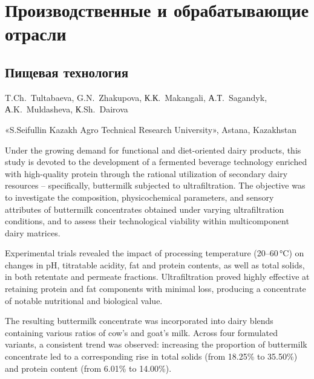 \let\cleardoublepage\clearpage
\part{Производственные и обрабатывающие отрасли}
\chapter{Пищевая технология}

\begin{header}

T.Ch.~Tultabaeva,
G.N.~Zhakupova,
К.К.~Makangali,
А.Т.~Sagandyk,
А.K.~Muldasheva,
К.Sh.~Dairova\envelope
\end{header}

\begin{affil}
«S.Seifullin Kazakh Agro Technical Research University», Astana, Kazakhstan

\end{affil}

Under the growing demand for functional and diet-oriented dairy
products, this study is devoted to the development of a fermented
beverage technology enriched with high-quality protein through the
rational utilization of secondary dairy resources -- specifically,
buttermilk subjected to ultra\-filtration. The objective was to
investigate the composition, physicochemical parameters, and sensory
attributes of buttermilk concentrates obtained under varying
ultrafiltration conditions, and to assess their technological viability
within multicomponent dairy matrices.

Experimental trials revealed the impact of processing temperature
(20--60\,°C) on changes in pH, titra\-table acidity, fat and protein
contents, as well as total solids, in both retentate and permeate
fractions. Ultra\-filtration proved highly effective at retaining protein
and fat components with minimal loss, producing a concentrate of notable
nutritional and biological value.

The resulting buttermilk concentrate was incorporated into dairy blends
containing various ratios of cow's and goat's milk. Across four
formulated variants, a consistent trend was observed: increasing the
proportion of buttermilk concentrate led to a corresponding rise in
total solids (from 18.25\% to 35.50\%) and protein content (from 6.01\%
to 14.00\%).

